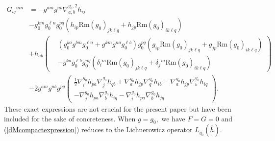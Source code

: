 \documentclass[12pt]{amsart}
\newcommand{\calM}{\mathcal{M}}
\renewcommand{\1}{{\mathbf 1}}
\newcommand{\Rm}{\mathrm{Rm}}
\theoremstyle{others}
\numberwithin{equation}{section}
\begin{document}
\begin{equation}\label{Gexpression}
\begin{split}
G_{ij}{}^{mn} & = - g^{am} g^{nb} \nabla^{g_0, 2}_{a,b} h_{ij} \\
& - g_0^{km} g_0^{\ell n} g_0^{pq} \left( h_{ip}   \Rm(g_0)_{jk\ell q} + h_{jp}  \Rm(g_0)_{ik\ell q} \right) \\
& + h_{ab} \left( \begin{split} & \left( g_0^{ka}  g^{bm} g_0^{\ell n} + g^{km} g^{na} g_0^{\ell b} \right) g_0^{pq} \left( g_{ip} \Rm(g_0)_{jk\ell q} + g_{jp} \Rm(g_0)_{ik\ell q} \right) \\
& - g^{ka} g_0^{\ell b} g_0^{nq} \left( \delta_i{}^m \Rm(g_0)_{jk\ell q} + \delta_j{}^m \Rm(g_0)_{ik\ell q} \right) \end{split} \right) \\
   & - 2 g^{am} g^{nb} g^{pq} \left( \begin{split} \frac12 \nabla^{g_0}_i h_{pa} \nabla^{g_0}_j h_{qb} + \nabla^{g_0}_a h_{jp} \nabla^{g_0}_q h_{ib} - \nabla^{g_0}_a h_{jp} \nabla^{g_0}_b h_{iq} \\ - \nabla^{g_0}_j h_{pa} \nabla^{g_0}_b h_{iq} - \nabla^{g_0}_i h_{pa} \nabla^{g_0}_b h_{jq} \end{split} \right).
\end{split}
\end{equation}
These exact expressions are not crucial for the present paper but have been included for the sake of concreteness.
When $g = g_0,$ we have $F = G = 0$ and (\ref{dMcompactexpression}) reduces to the Lichnerowicz operator $L_{g_0}(\hat{h}).$
\end{document}
